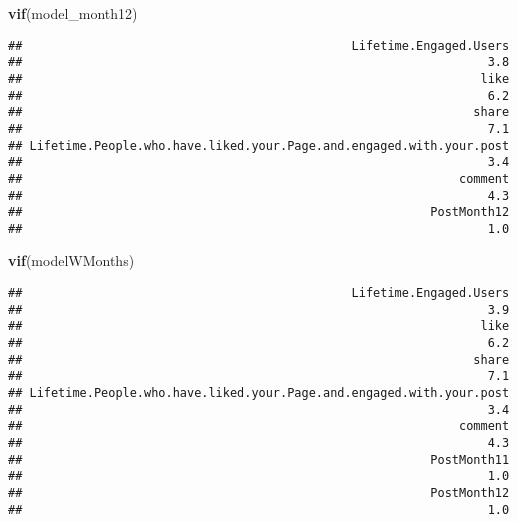 \documentclass[
]{article}
\newenvironment{Shaded}{\begin{snugshade}}{\end{snugshade}}
\newcommand{\KeywordTok}[1]{\textcolor[rgb]{0.13,0.29,0.53}{\textbf{#1}}}
\newcommand{\NormalTok}[1]{#1}
\begin{document}
\begin{Shaded}
\begin{Highlighting}[]
\KeywordTok{vif}\NormalTok{(model_month12)}
\end{Highlighting}
\end{Shaded}

\begin{verbatim}
##                                              Lifetime.Engaged.Users 
##                                                                 3.8 
##                                                                like 
##                                                                 6.2 
##                                                               share 
##                                                                 7.1 
## Lifetime.People.who.have.liked.your.Page.and.engaged.with.your.post 
##                                                                 3.4 
##                                                             comment 
##                                                                 4.3 
##                                                         PostMonth12 
##                                                                 1.0
\end{verbatim}

\begin{Shaded}
\begin{Highlighting}[]
\KeywordTok{vif}\NormalTok{(modelWMonths)}
\end{Highlighting}
\end{Shaded}

\begin{verbatim}
##                                              Lifetime.Engaged.Users 
##                                                                 3.9 
##                                                                like 
##                                                                 6.2 
##                                                               share 
##                                                                 7.1 
## Lifetime.People.who.have.liked.your.Page.and.engaged.with.your.post 
##                                                                 3.4 
##                                                             comment 
##                                                                 4.3 
##                                                         PostMonth11 
##                                                                 1.0 
##                                                         PostMonth12 
##                                                                 1.0
\end{verbatim}
\end{document}
